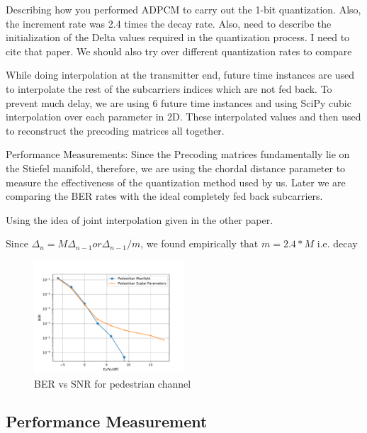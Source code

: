\documentclass[conference]{IEEEtran}
\begin{document}
Describing how you performed ADPCM to carry out the 1-bit quantization. Also, the increment rate was 2.4 times the decay rate. Also, need to describe the initialization of the Delta values required in the quantization process. I need to cite that paper. We should also try over different quantization rates to compare \cite{Gupt1905:Predictive} 

While doing interpolation at the transmitter end, future time instances are used to interpolate the rest of the subcarriers indices which are not fed back. To prevent much delay, we are using 6 future time instances and using SciPy cubic interpolation over each parameter in 2D. These interpolated values and then used to reconstruct the precoding matrices all together. 

Performance Measurements: 
Since the Precoding matrices fundamentally lie on the Stiefel manifold, therefore, we are using the chordal distance parameter to measure the effectiveness of the quantization method used by us. Later we are comparing the BER rates with the ideal completely fed back subcarriers. 

Using the idea of joint interpolation given in the other paper. 

Since $\Delta_{n} = M\Delta_{n-1} or \Delta_{n-1}/m $, we found empirically that $m=2.4*M$ i.e. decay 

\begin{figure} 
\includegraphics[width=0.5\textwidth]{images/pedestrian.pdf} 
\caption{BER vs SNR for pedestrian channel} 
\label{ber_overview} 
\vspace{-5pt} 
\end{figure}

\subsection{Performance Measurement} 

\label{setting} 
\end{document}
